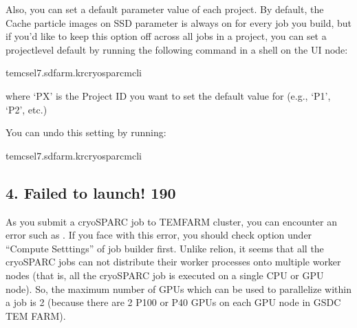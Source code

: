 \documentclass[a4paper,10pt,english]{sphinxmanual}
\begin{document}
\sphinxAtStartPar
Also, you can set a default parameter value of each project. By default, the Cache particle images on SSD parameter is always on for every job you build,
but if you’d like to keep this option off across all jobs in a project, you can set a project\sphinxhyphen{}level default by running the following command in a shell on the UI node:

\begin{sphinxVerbatim}[commandchars=\\\{\}]
tem\PYGZhy{}cs\PYGZhy{}el7.sdfarm.kr\PYGZdl{}\PYGZgt{}cryosparcmcli
\end{sphinxVerbatim}

\sphinxAtStartPar
where ‘PX’ is the Project ID you want to set the default value for (e.g., ‘P1’, ‘P2’, etc.)

\sphinxAtStartPar
You can undo this setting by running:

\begin{sphinxVerbatim}[commandchars=\\\{\}]
tem\PYGZhy{}cs\PYGZhy{}el7.sdfarm.kr\PYGZdl{}\PYGZgt{}cryosparcmcli
\end{sphinxVerbatim}


\subsection{4. Failed to launch! 190}
\label{\detokenize{cryoSPARC:failed-to-launch-190}}
\sphinxAtStartPar
As you submit a cryoSPARC job to TEM\sphinxhyphen{}FARM cluster, you can encounter an error such as .
If you face with this error, you should check  option under “Compute Setttings” of job builder first.
Unlike relion, it seems that all the cryoSPARC jobs can not distribute their worker processes onto multiple worker nodes
(that is, all the cryoSPARC job is executed on a single CPU or GPU node).
So, the maximum number of GPUs which can be used to parallelize within a job is 2 (because there are 2 P100 or P40 GPUs on each GPU node in GSDC TEM FARM).

\end{document}
